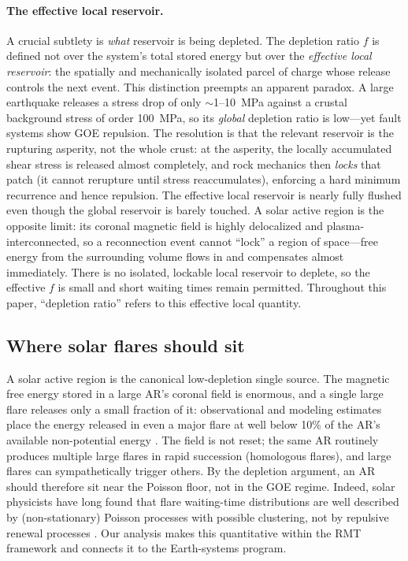 \documentclass[12pt,a4paper]{article}
\begin{document}
\paragraph{The effective local reservoir.} A crucial subtlety is \emph{what} reservoir is being depleted. The depletion ratio $f$ is defined not over the system's total stored energy but over the \emph{effective local reservoir}: the spatially and mechanically isolated parcel of charge whose release controls the next event. This distinction preempts an apparent paradox. A large earthquake releases a stress drop of only $\sim$1--10~MPa against a crustal background stress of order 100~MPa, so its \emph{global} depletion ratio is low---yet fault systems show GOE repulsion. The resolution is that the relevant reservoir is the rupturing asperity, not the whole crust: at the asperity, the locally accumulated shear stress is released almost completely, and rock mechanics then \emph{locks} that patch (it cannot rerupture until stress reaccumulates), enforcing a hard minimum recurrence and hence repulsion. The effective local reservoir is nearly fully flushed even though the global reservoir is barely touched. A solar active region is the opposite limit: its coronal magnetic field is highly delocalized and plasma-interconnected, so a reconnection event cannot ``lock'' a region of space---free energy from the surrounding volume flows in and compensates almost immediately. There is no isolated, lockable local reservoir to deplete, so the effective $f$ is small and short waiting times remain permitted. Throughout this paper, ``depletion ratio'' refers to this effective local quantity.

\subsection{Where solar flares should sit}

A solar active region is the canonical low-depletion single source. The magnetic free energy stored in a large AR's coronal field is enormous, and a single large flare releases only a small fraction of it: observational and modeling estimates place the energy released in even a major flare at well below 10\% of the AR's available non-potential energy \citep{emslie2012,aschwanden2014}. The field is not reset; the same AR routinely produces multiple large flares in rapid succession (homologous flares), and large flares can sympathetically trigger others. By the depletion argument, an AR should therefore sit near the Poisson floor, not in the GOE regime. Indeed, solar physicists have long found that flare waiting-time distributions are well described by (non-stationary) Poisson processes with possible clustering, not by repulsive renewal processes \citep{wheatland2000,wheatland2002,aschwanden2011}. Our analysis makes this quantitative within the RMT framework and connects it to the Earth-systems program.
\end{document}
